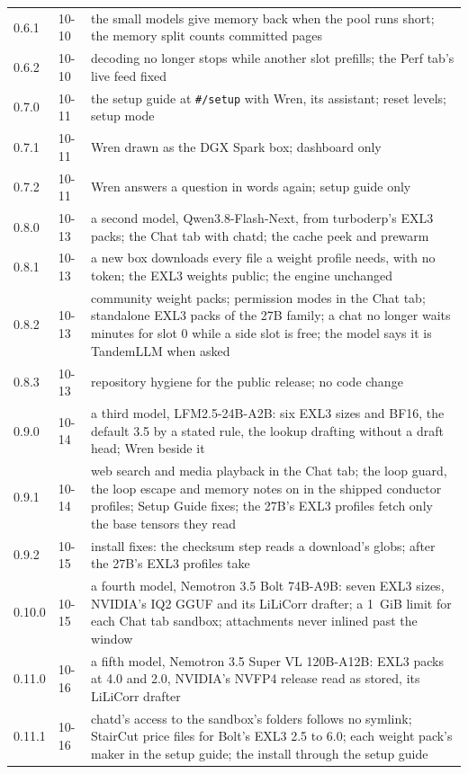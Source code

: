 \begin{table}[htbp]
\begin{tabularx}{\linewidth}{@{}L{.2\linewidth}L{.15\linewidth}Y@{}}
0.6.1 & 10-10 & the small models give memory back when the pool runs short; the memory split counts committed pages \\
0.6.2 & 10-10 & decoding no longer stops while another slot prefills; the Perf tab's live feed fixed \\
0.7.0 & 10-11 & the setup guide at \texttt{\#/setup} with Wren, its assistant; reset levels; setup mode \\
0.7.1 & 10-11 & Wren drawn as the DGX Spark box; dashboard only \\
0.7.2 & 10-11 & Wren answers a question in words again; setup guide only \\
0.8.0 & 10-13 & a second model, Qwen3.8-Flash-Next, from turboderp's EXL3 packs; the Chat tab with chatd; the cache peek and prewarm \\
0.8.1 & 10-13 & a new box downloads every file a weight profile needs, with no token; the EXL3 weights public; the engine unchanged \\
0.8.2 & 10-13 & community weight packs; permission modes in the Chat tab; standalone EXL3 packs of the 27B family; a chat no longer waits minutes for slot 0 while a side slot is free; the model says it is TandemLLM when asked \\
0.8.3 & 10-13 & repository hygiene for the public release; no code change \\
0.9.0 & 10-14 & a third model, LFM2.5-24B-A2B: six EXL3 sizes and BF16, the default 3.5 by a stated rule, the lookup drafting without a draft head; Wren beside it \\
0.9.1 & 10-14 & web search and media playback in the Chat tab; the loop guard, the loop escape and memory notes on in the shipped conductor profiles; Setup Guide fixes; the 27B's EXL3 profiles fetch only the base tensors they read \\
0.9.2 & 10-15 & install fixes: the checksum step reads a download's globs; after  the 27B's EXL3 profiles take  \\
0.10.0 & 10-15 & a fourth model, Nemotron 3.5 Bolt 74B-A9B: seven EXL3 sizes, NVIDIA's IQ2 GGUF and its LiLiCorr drafter; a 1~GiB limit for each Chat tab sandbox; attachments never inlined past the window \\
0.11.0 & 10-16 & a fifth model, Nemotron 3.5 Super VL 120B-A12B: EXL3 packs at 4.0 and 2.0, NVIDIA's NVFP4 release read as stored, its LiLiCorr drafter \\
0.11.1 & 10-16 & chatd's access to the sandbox's folders follows no symlink; StairCut price files for Bolt's EXL3 2.5 to 6.0; each weight pack's maker in the setup guide; the install through the setup guide \\

\end{tabularx}
\end{table}
